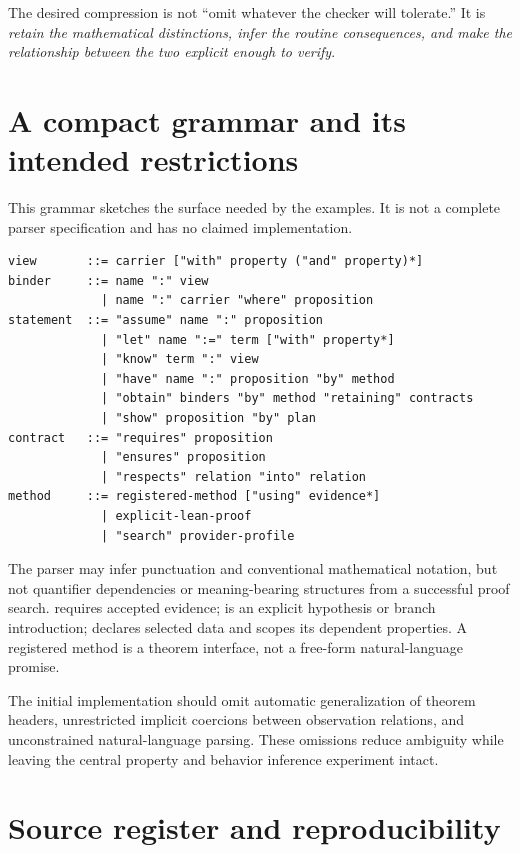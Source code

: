 \documentclass[11pt,letterpaper]{article}
\newcommand{\code}[1]{\texttt{\detokenize{#1}}}
\theoremstyle{definition}
\theoremstyle{remark}
\begin{document}
The desired compression is not ``omit whatever the checker will tolerate.''
It is \emph{retain the mathematical distinctions, infer the routine consequences,
and make the relationship between the two explicit enough to verify}.

\appendix
\section{A compact grammar and its intended restrictions}\label{app:grammar}

This grammar sketches the surface needed by the examples. It is not a complete
parser specification and has no claimed implementation.
\begin{lstlisting}
view       ::= carrier ["with" property ("and" property)*]
binder     ::= name ":" view
             | name ":" carrier "where" proposition
statement  ::= "assume" name ":" proposition
             | "let" name ":=" term ["with" property*]
             | "know" term ":" view
             | "have" name ":" proposition "by" method
             | "obtain" binders "by" method "retaining" contracts
             | "show" proposition "by" plan
contract   ::= "requires" proposition
             | "ensures" proposition
             | "respects" relation "into" relation
method     ::= registered-method ["using" evidence*]
             | explicit-lean-proof
             | "search" provider-profile
\end{lstlisting}
The parser may infer punctuation and conventional mathematical notation, but
not quantifier dependencies or meaning-bearing structures from a successful
proof search. \code{know} requires accepted evidence; \code{assume} is an explicit
hypothesis or branch introduction; \code{obtain} declares selected data and
scopes its dependent properties. A registered method is a theorem interface,
not a free-form natural-language promise.

The initial implementation should omit automatic generalization of theorem
headers, unrestricted implicit coercions between observation relations, and
unconstrained natural-language parsing. These omissions reduce ambiguity while
leaving the central property and behavior inference experiment intact.

\section{Source register and reproducibility}\label{app:sources}
\end{document}
